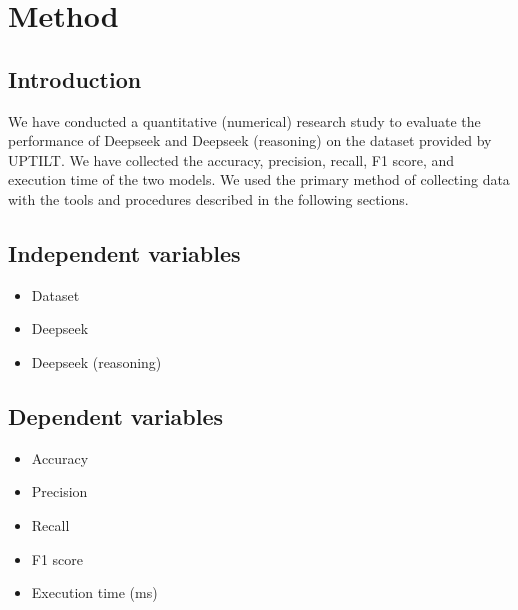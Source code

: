 \section{Method}
%
%
%

\subsection{Introduction}
%
%
%
We have conducted a quantitative (numerical) research study to evaluate the performance
of Deepseek and Deepseek (reasoning) on the dataset provided by UPTILT. We have
collected the accuracy, precision, recall, F1 score, and execution time of the
two models. We used the primary method of collecting data with the tools and procedures
described in the following sections.

\subsection{Independent variables}
\begin{itemize}
    \item Dataset

    \item Deepseek

    \item Deepseek (reasoning)
\end{itemize}

\subsection{Dependent variables}

\begin{itemize}
    \item Accuracy %

    \item Precision %

    \item Recall

    \item F1 score

    \item Execution time (ms)
\end{itemize}

